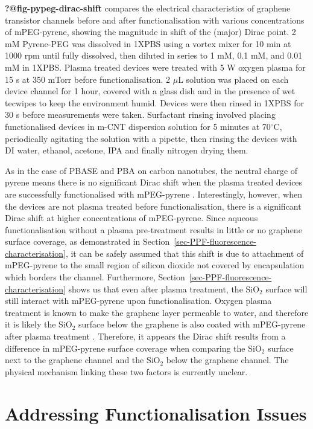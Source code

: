 \documentclass[
  a4paper,
]{scrbook}
\begin{document}
\textbf{?@fig-pypeg-dirac-shift} compares the electrical characteristics
of graphene transistor channels before and after functionalisation with
various concentrations of mPEG-pyrene, showing the magnitude in shift of
the (major) Dirac point. 2 mM Pyrene-PEG was dissolved in 1XPBS using a
vortex mixer for 10 min at 1000 rpm until fully dissolved, then diluted
in series to 1 mM, 0.1 mM, and 0.01 mM in 1XPBS. Plasma treated devices
were treated with 5 W oxygen plasma for 15 s at 350 mTorr before
functionalisation. 2 \(\mu\)L solution was placed on each device channel
for 1 hour, covered with a glass dish and in the presence of wet
tecwipes to keep the environment humid. Devices were then rinsed in
1XPBS for 30 s before measurements were taken. Surfactant rinsing
involved placing functionalised devices in m-CNT dispersion solution for
5 minutes at 70\(^\circ\)C, periodically agitating the solution with a
pipette, then rinsing the devices with DI water, ethanol, acetone, IPA
and finally nitrogen drying them.

As in the case of PBASE and PBA on carbon nanotubes, the neutral charge
of pyrene means there is no significant Dirac shift when the plasma
treated devices are successfully functionalised with mPEG-pyrene
\autocite{Lerner2012}. Interestingly, however, when the devices are not
plasma treated before functionalisation, there is a significant Dirac
shift at higher concentrations of mPEG-pyrene. Since aqueous
functionalisation without a plasma pre-treatment results in little or no
graphene surface coverage, as demonstrated in
Section~\ref{sec-PPF-fluorescence-characterisation}, it can be safely
assumed that this shift is due to attachment of mPEG-pyrene to the small
region of silicon dioxide not covered by encapsulation which borders the
channel. Furthermore,
Section~\ref{sec-PPF-fluorescence-characterisation} shows us that even
after plasma treatment, the SiO\(_2\) surface will still interact with
mPEG-pyrene upon functionalisation. Oxygen plasma treatment is known to
make the graphene layer permeable to water, and therefore it is likely
the SiO\(_2\) surface below the graphene is also coated with mPEG-pyrene
after plasma treatment \autocite{Surwade2015}. Therefore, it appears the
Dirac shift results from a difference in mPEG-pyrene surface coverage
when comparing the SiO\(_2\) surface next to the graphene channel and
the SiO\(_2\) below the graphene channel. The physical mechanism linking
these two factors is currently unclear.

\hypertarget{sec-impediments}{%
\section{Addressing Functionalisation Issues}\label{sec-impediments}}
\end{document}

